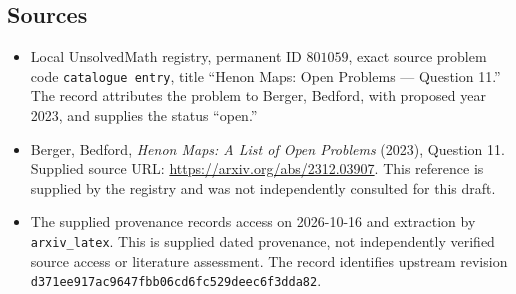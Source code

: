 \documentclass[11pt]{article}
\begin{document}
\subsection{Sources}
\begin{itemize}
\item Local UnsolvedMath registry, permanent ID \(801059\), exact source problem code \texttt{catalogue entry}, title ``Henon Maps: Open Problems --- Question 11.'' The record attributes the problem to Berger, Bedford, with proposed year 2023, and supplies the status ``open.''
\item Berger, Bedford, \emph{Henon Maps: A List of Open Problems} (2023), Question 11. Supplied source URL: \url{https://arxiv.org/abs/2312.03907}. This reference is supplied by the registry and was not independently consulted for this draft.
\item The supplied provenance records access on 2026-10-16 and extraction by \texttt{arxiv\_latex}. This is supplied dated provenance, not independently verified source access or literature assessment. The record identifies upstream revision \texttt{d371ee917ac9647fbb06cd6fc529deec6f3dda82}.
\end{itemize}
\end{document}
